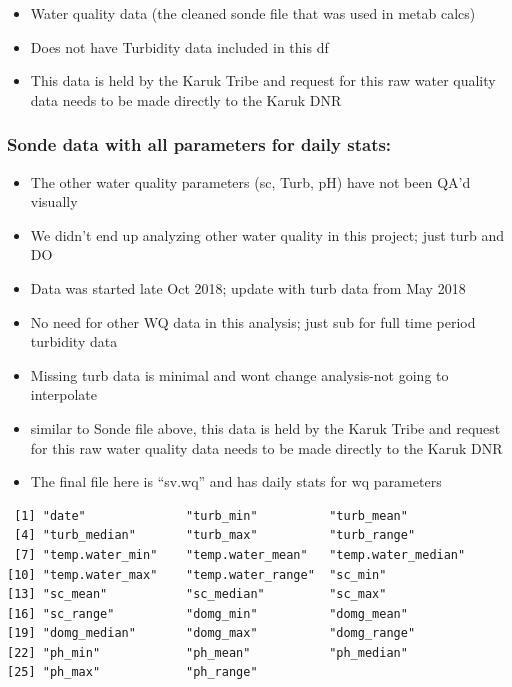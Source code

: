 \documentclass[
  letterpaper,
  DIV=11,
  numbers=noendperiod]{scrartcl}
\providecommand{\tightlist}{%
  \setlength{\itemsep}{0pt}\setlength{\parskip}{0pt}}\usepackage{longtable,booktabs,array}
\begin{document}
\begin{itemize}
\tightlist
\item
  Water quality data (the cleaned sonde file that was used in metab
  calcs)
\item
  Does not have Turbidity data included in this df
\item
  This data is held by the Karuk Tribe and request for this raw water
  quality data needs to be made directly to the Karuk DNR
\end{itemize}

\small

\normalsize

\subsubsection{Sonde data with all parameters for daily
stats:}\label{sonde-data-with-all-parameters-for-daily-stats}

\begin{itemize}
\tightlist
\item
  The other water quality parameters (sc, Turb, pH) have not been QA'd
  visually
\item
  We didn't end up analyzing other water quality in this project; just
  turb and DO
\item
  Data was started late Oct 2018; update with turb data from May 2018
\item
  No need for other WQ data in this analysis; just sub for full time
  period turbidity data
\item
  Missing turb data is minimal and wont change analysis-not going to
  interpolate
\item
  similar to Sonde file above, this data is held by the Karuk Tribe and
  request for this raw water quality data needs to be made directly to
  the Karuk DNR
\item
  The final file here is ``sv.wq'' and has daily stats for wq parameters
\end{itemize}

\small

\begin{verbatim}
 [1] "date"              "turb_min"          "turb_mean"        
 [4] "turb_median"       "turb_max"          "turb_range"       
 [7] "temp.water_min"    "temp.water_mean"   "temp.water_median"
[10] "temp.water_max"    "temp.water_range"  "sc_min"           
[13] "sc_mean"           "sc_median"         "sc_max"           
[16] "sc_range"          "domg_min"          "domg_mean"        
[19] "domg_median"       "domg_max"          "domg_range"       
[22] "ph_min"            "ph_mean"           "ph_median"        
[25] "ph_max"            "ph_range"         
\end{verbatim}
\end{document}
